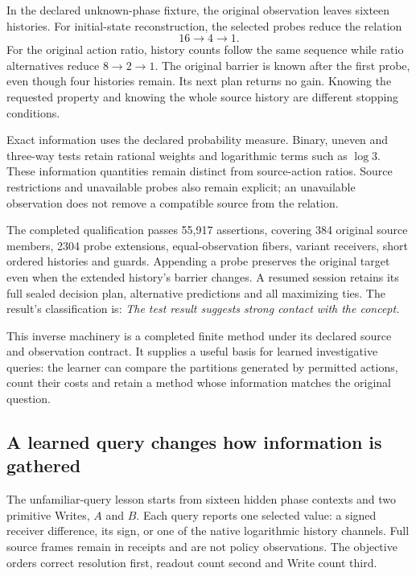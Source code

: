 In the declared unknown-phase fixture, the original observation leaves sixteen histories. For initial-state reconstruction, the selected probes reduce the relation
\[
 16\longrightarrow4\longrightarrow1.
\]
For the original action ratio, history counts follow the same sequence while ratio alternatives reduce $8\to2\to1$. The original barrier is known after the first probe, even though four histories remain. Its next plan returns no gain. Knowing the requested property and knowing the whole source history are different stopping conditions.

Exact information uses the declared probability measure. Binary, uneven and three-way tests retain rational weights and logarithmic terms such as $\log3$. These information quantities remain distinct from source-action ratios. Source restrictions and unavailable probes also remain explicit; an unavailable observation does not remove a compatible source from the relation.

The completed qualification passes 55,917 assertions, covering 384 original source members, 2304 probe extensions, equal-observation fibers, variant receivers, short ordered histories and guards. Appending a probe preserves the original target even when the extended history's barrier changes. A resumed session retains its full sealed decision plan, alternative predictions and all maximizing ties. The result's classification is: \emph{The test result suggests strong contact with the concept.}

This inverse machinery is a completed finite method under its declared source and observation contract. It supplies a useful basis for learned investigative queries: the learner can compare the partitions generated by permitted actions, count their costs and retain a method whose information matches the original question.

\subsection{A learned query changes how information is gathered}
\label{v3-runtime-queries}

The unfamiliar-query lesson starts from sixteen hidden phase contexts and two primitive Writes, $A$ and $B$. Each query reports one selected value: a signed receiver difference, its sign, or one of the native logarithmic history channels. Full source frames remain in receipts and are not policy observations. The objective orders correct resolution first, readout count second and Write count third.

